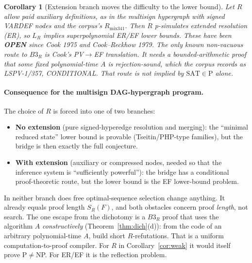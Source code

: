 \documentclass[11pt]{article}
\newtheorem{corollary}[theorem]{Corollary}
\newcommand{\SAT}{\mathrm{SAT}}
\begin{document}
\begin{corollary}[Extension branch moves the difficulty to the lower bound]\label{cor:ext}
Let $R$ allow paid auxiliary definitions, as in the multisign hypergraph with signed
VARDEF nodes and the corpus's $R_{\mathrm{mix341}}$. Then $R$ p-simulates extended
resolution (ER), so $L_R$ implies superpolynomial ER/EF lower bounds. These have been
\textbf{OPEN} since Cook 1975 and Cook--Reckhow 1979. The only known non-vacuous
route to $B3_R$ is Cook's PV$\to$EF translation. It needs a
\emph{bounded-arithmetic proof} that some fixed polynomial-time $A$ is
rejection-sound, which the corpus records as LSPV-1/357, CONDITIONAL. That route is
not implied by $\SAT\in\mathrm P$ alone.
\end{corollary}

\paragraph{Consequence for the multisign DAG-hypergraph program.}
The choice of $R$ is forced into one of two branches:
\begin{itemize}
\item \textbf{No extension} (pure signed-hyperedge resolution and merging): the
``minimal reduced state'' lower bound is provable (Tseitin/PHP-type families), but the
bridge is then exactly the full conjecture.
\item \textbf{With extension} (auxiliary or compressed nodes, needed so that the
inference system is ``sufficiently powerful''): the bridge has a conditional
proof-theoretic route, but the lower bound is the EF lower-bound problem.
\end{itemize}
In neither branch does free optimal-sequence selection change anything. It already
equals proof length $S_R(F)$, and both obstacles concern proof \emph{length}, not
search. The one escape from the dichotomy is a $B3_R$ proof that uses the
algorithm $A$ \emph{constructively} (Theorem~\ref{thm:dich}(d)): from the code of an
arbitrary polynomial-time $A$, build short $R$-refutations. That is a uniform
computation-to-proof compiler. For $R$ in Corollary~\ref{cor:weak} it would itself
prove P$\neq$NP. For ER/EF it is the reflection problem.
\end{document}
